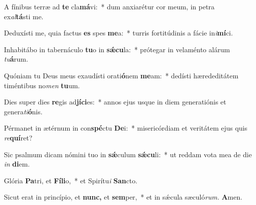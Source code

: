 \item A fínibus terræ ad \textbf{te} cla\textbf{má}vi:~* dum anxiarétur cor meum, in petra\\ ex\tinyhspace\textit{al}\textbf{tá}sti me.
\item Deduxísti me, quia factus \textbf{es} spes \textbf{me}a:~* turris fortitúdinis a fácie in\textit{i}\textbf{mí}ci.
\item Inhabitábo in tabernáculo \textbf{tu}o in \textbf{sǽ}\textbf{cu}la:~* prótegar in velaménto alárum \textit{tu}\textbf{á}rum.
\item Quóniam tu Deus meus exaudísti orati\textbf{ó}nem \textbf{me}am:~* dedísti hærededitátem timéntibus no\textit{men} \textbf{tu}um.
\item Dies super dies \textbf{re}gis ad\textbf{jí}\textbf{ci}es:~* annos ejus usque in diem generatiónis et genera\tinyhspace\textit{ti}\textbf{ó}nis.
\item Pérmanet in ætérnum in con\textbf{spé}ctu \textbf{De}i:~* misericórdiam et veritátem ejus quis \textit{re}\textbf{quí}ret?
\item Sic psalmum dicam nómini tuo in \textbf{sǽ}culum \textbf{sǽ}\textbf{cu}li:~* ut reddam vota mea de die \textit{in} \textbf{di}em.
\item Glória \textbf{Pa}tri, et \textbf{Fí}\textbf{li}o,~* et Spirítu\textit{i} \textbf{San}cto.
\item Sicut erat in princípio, et \textbf{nunc,} et \textbf{sem}per,~* et in sǽcula sæculó\textit{rum.} \textbf{A}men.
